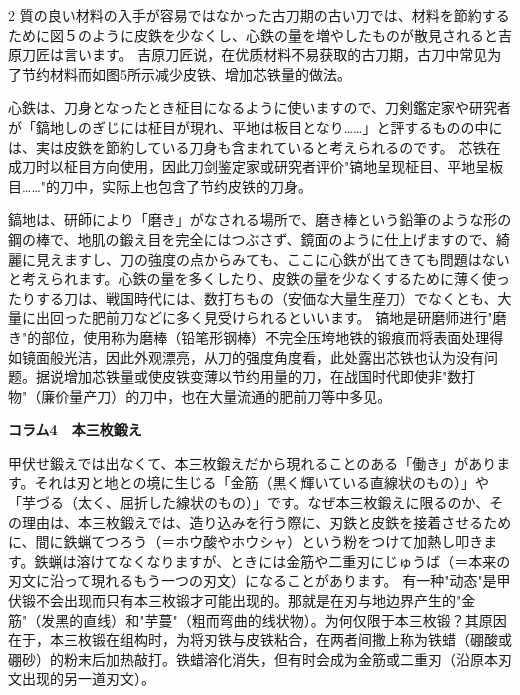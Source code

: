 \documentclass[12pt,UTF8]{ctexbook}
\begin{document}
\begin{paracol}{2}
質の良い材料の入手が容易ではなかった古刀期の古い刀では、材料を節約するために図５のように皮鉄を少なくし、心鉄の量を増やしたものが散見されると吉原刀匠は言います。
\switchcolumn*
吉原刀匠说，在优质材料不易获取的古刀期，古刀中常见为了节约材料而如图5所示减少皮铁、增加芯铁量的做法。
\switchcolumn*

心鉄は、刀身となったとき柾目になるように使いますので、刀剣鑑定家や研究者が「鎬地しのぎじには柾目が現れ、平地は板目となり……」と評するものの中には、実は皮鉄を節約している刀身も含まれていると考えられるのです。
\switchcolumn*
芯铁在成刀时以柾目方向使用，因此刀剑鉴定家或研究者评价"镐地呈现柾目、平地呈板目……"的刀中，实际上也包含了节约皮铁的刀身。
\switchcolumn*

鎬地は、研師により「磨き」がなされる場所で、磨き棒という鉛筆のような形の鋼の棒で、地肌の鍛え目を完全にはつぶさず、鏡面のように仕上げますので、綺麗に見えますし、刀の強度の点からみても、ここに心鉄が出てきても問題はないと考えられます。心鉄の量を多くしたり、皮鉄の量を少なくするために薄く使ったりする刀は、戦国時代には、数打ちもの（安価な大量生産刀）でなくとも、大量に出回った肥前刀などに多く見受けられるといいます。
\switchcolumn*
镐地是研磨师进行"磨き"的部位，使用称为磨棒（铅笔形钢棒）不完全压垮地铁的锻痕而将表面处理得如镜面般光洁，因此外观漂亮，从刀的强度角度看，此处露出芯铁也认为没有问题。据说增加芯铁量或使皮铁变薄以节约用量的刀，在战国时代即使非"数打物"（廉价量产刀）的刀中，也在大量流通的肥前刀等中多见。
\switchcolumn*

{\bfseries コラム4　本三枚鍛え}
\switchcolumn*

甲伏せ鍛えでは出なくて、本三枚鍛えだから現れることのある「働き」があります。それは刃と地との境に生じる「金筋（黒く輝いている直線状のもの）」や「芋づる（太く、屈折した線状のもの）」です。なぜ本三枚鍛えに限るのか、その理由は、本三枚鍛えでは、造り込みを行う際に、刃鉄と皮鉄を接着させるために、間に鉄蝋てつろう（＝ホウ酸やホウシャ）という粉をつけて加熱し叩きます。鉄蝋は溶けてなくなりますが、ときには金筋や二重刃にじゅうば（＝本来の刃文に沿って現れるもう一つの刃文）になることがあります。
\switchcolumn*
有一种"动态"是甲伏锻不会出现而只有本三枚锻才可能出现的。那就是在刃与地边界产生的"金筋"（发黑的直线）和"芋蔓"（粗而弯曲的线状物）。为何仅限于本三枚锻？其原因在于，本三枚锻在组构时，为将刃铁与皮铁粘合，在两者间撒上称为铁蜡（硼酸或硼砂）的粉末后加热敲打。铁蜡溶化消失，但有时会成为金筋或二重刃（沿原本刃文出现的另一道刃文）。
\end{paracol}
\end{document}
